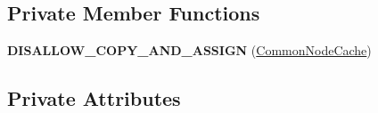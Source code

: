 \subsection*{Private Member Functions}
\begin{DoxyCompactItemize}
\item 
{\bfseries D\+I\+S\+A\+L\+L\+O\+W\+\_\+\+C\+O\+P\+Y\+\_\+\+A\+N\+D\+\_\+\+A\+S\+S\+I\+GN} (\hyperlink{classv8_1_1internal_1_1compiler_1_1_common_node_cache}{Common\+Node\+Cache})\hypertarget{classv8_1_1internal_1_1compiler_1_1_common_node_cache_ade0092442959ee49e6d8e228070597fe}{}\label{classv8_1_1internal_1_1compiler_1_1_common_node_cache_ade0092442959ee49e6d8e228070597fe}

\end{DoxyCompactItemize}
\subsection*{Private Attributes}
